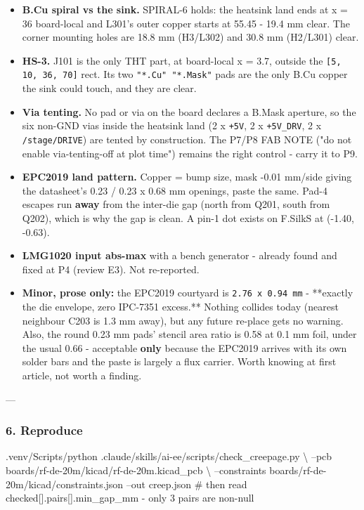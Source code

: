 \documentclass[11pt,a4paper]{article}
\begin{document}
\begin{itemize}
F.Paste anywhere on either spiral.{*}{*} The windings are fully mask-covered and
no stencil aperture will ever be cut over them. This was the failure mode I
went looking for; it is not present.
\item \textbf{B.Cu spiral vs the sink.} SPIRAL-6 holds: the heatsink land ends at
x = 36 board-local and L301's outer copper starts at 55.45 - 19.4 mm clear.
The corner mounting holes are 18.8 mm (H3/L302) and 30.8 mm (H2/L301) clear.
\item \textbf{HS-3.} J101 is the only THT part, at board-local x = 3.7, outside the
\texttt{{[}5, 10, 36, 70{]}} rect. Its two \texttt{"{*}.Cu" "{*}.Mask"} pads are the only B.Cu
copper the sink could touch, and they are clear.
\item \textbf{Via tenting.} No pad or via on the board declares a B.Mask aperture, so
the six non-GND vias inside the heatsink land (2 x \texttt{+5V}, 2 x \texttt{+5V\_DRV},
2 x \texttt{/stage/DRIVE}) are tented by construction. The P7/P8 FAB NOTE
("do not enable via-tenting-off at plot time") remains the right control -
carry it to P9.
\item \textbf{EPC2019 land pattern.} Copper = bump size, mask -0.01 mm/side giving the
datasheet's 0.23 / 0.23 x 0.68 mm openings, paste the same. Pad-4 escapes run
\textbf{away} from the inter-die gap (north from Q201, south from Q202), which is
why the gap is clean. A pin-1 dot exists on F.SilkS at (-1.40, -0.63).
\item \textbf{LMG1020 input abs-max} with a bench generator - already found and fixed at
P4 (review E3). Not re-reported.
\item \textbf{Minor, prose only:} the EPC2019 courtyard is \texttt{2.76 x 0.94 mm} - {*}{*}exactly
the die envelope, zero IPC-7351 excess.{*}{*} Nothing collides today (nearest
neighbour C203 is 1.3 mm away), but any future re-place gets no warning.
Also, the round 0.23 mm pads' stencil area ratio is 0.58 at 0.1 mm foil,
under the usual 0.66 - acceptable \textbf{only} because the EPC2019 arrives with
its own solder bars and the paste is largely a flux carrier. Worth knowing at
first article, not worth a finding.
\end{itemize}
---

\subsubsection*{6. Reproduce}
.venv/Scripts/python .claude/skills/ai-ee/scripts/check\_creepage.py \textbackslash{} --pcb boards/rf-de-20m/kicad/rf-de-20m.kicad\_pcb \textbackslash{} --constraints boards/rf-de-20m/kicad/constraints.json --out creep.json \# then read checked{[}{]}.pairs{[}{]}.min\_gap\_mm - only 3 pairs are non-null
\end{document}
